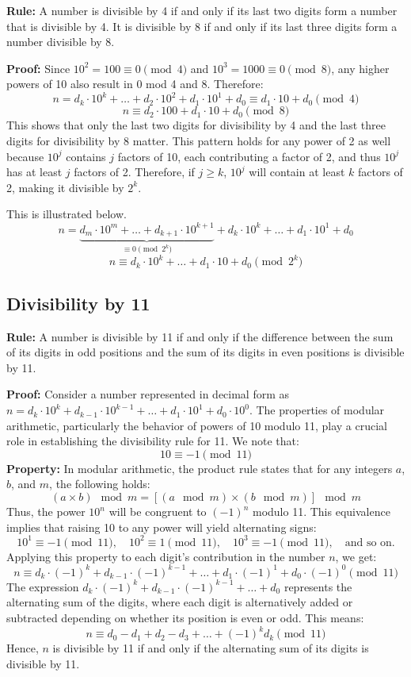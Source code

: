 \documentclass{article}
\begin{document}
\textbf{Rule:} A number is divisible by 4 if and only if its last two digits form a number that is divisible by 4. It is divisible by 8 if and only if its last three digits form a number divisible by 8.

\textbf{Proof:}
Since \( 10^2 = 100 \equiv 0 \pmod{4} \) and \( 10^3 = 1000 \equiv 0 \pmod{8} \), any higher powers of 10 also result in 0 mod 4 and 8. Therefore:
\[ n = d_k \cdot 10^k + \ldots + d_2 \cdot 10^2 + d_1 \cdot 10^1 + d_0 \equiv d_1 \cdot 10 + d_0 \pmod{4} \]
\[ n \equiv d_2 \cdot 100 + d_1 \cdot 10 + d_0 \pmod{8} \]
This shows that only the last two digits for divisibility by 4 and the last three digits for divisibility by 8 matter.
This pattern holds for any power of 2 as well because $10^j$ contains $j$ factors of 10, each contributing a factor of 2, and thus $10^j$ has at least $j$ factors of 2. Therefore, if $j \geq k$, $10^j$ will contain at least $k$ factors of 2, making it divisible by $2^k$.

This is illustrated below.
\[n = \underbrace{d_m \cdot 10^m + \ldots + d_{k+1} \cdot 10^{k+1}}_{\equiv 0 \pmod{2^k}} + d_k \cdot 10^k + \ldots + d_1 \cdot 10^1 + d_0\]
\[n \equiv d_k \cdot 10^k + \ldots + d_1 \cdot 10 + d_0 \pmod{2^k}\]

\subsection*{Divisibility by 11}

\textbf{Rule:} A number is divisible by 11 if and only if the difference between the sum of its digits in odd positions and the sum of its digits in even positions is divisible by 11.

\textbf{Proof:}
Consider a number represented in decimal form as \( n = d_k \cdot 10^k + d_{k-1} \cdot 10^{k-1} + \ldots + d_1 \cdot 10^1 + d_0 \cdot 10^0 \). The properties of modular arithmetic, particularly the behavior of powers of 10 modulo 11, play a crucial role in establishing the divisibility rule for 11. We note that:
\[ 10 \equiv -1 \pmod{11} \]
\textbf{Property:} In modular arithmetic, the product rule states that for any integers \( a \), \( b \), and \( m \), the following holds:
\[ (a \times b) \mod m = [(a \mod m) \times (b \mod m)] \mod m \]
Thus, the power \(10^n\) will be congruent to \((-1)^n\) modulo 11. 
This equivalence implies that raising 10 to any power will yield alternating signs:
\[
10^1 \equiv -1 \pmod{11}, \quad 10^2 \equiv 1 \pmod{11}, \quad 10^3 \equiv -1 \pmod{11}, \quad \text{and so on.}
\]
Applying this property to each digit's contribution in the number \( n \), we get:
\[
n \equiv d_k \cdot (-1)^k + d_{k-1} \cdot (-1)^{k-1} + \ldots + d_1 \cdot (-1)^1 + d_0 \cdot (-1)^0 \pmod{11}
\]
The expression \(d_k \cdot (-1)^k + d_{k-1} \cdot (-1)^{k-1} + \ldots + d_0\) represents the alternating sum of the digits, where each digit is alternatively added or subtracted depending on whether its position is even or odd. This means:
\[
n \equiv d_0 - d_1 + d_2 - d_3 + \ldots + (-1)^k d_k \pmod{11}
\]
Hence, \( n \) is divisible by 11 if and only if the alternating sum of its digits is divisible by 11. 
\end{document}
